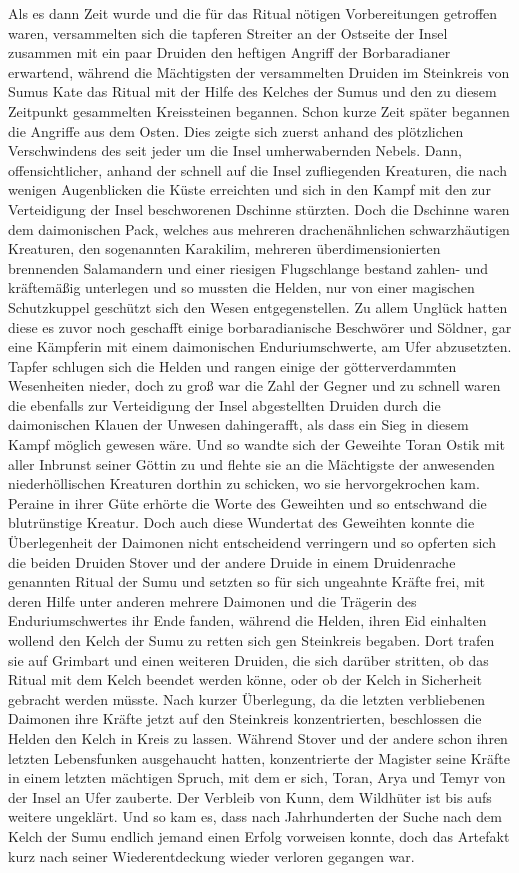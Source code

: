 Als es dann Zeit wurde und die für das Ritual nötigen Vorbereitungen getroffen waren, versammelten sich die tapferen Streiter an der Ostseite der Insel zusammen mit ein paar Druiden den heftigen Angriff der Borbaradianer erwartend, während die Mächtigsten der versammelten Druiden im Steinkreis von Sumus Kate das Ritual mit der Hilfe des Kelches der Sumus und den zu diesem Zeitpunkt gesammelten Kreissteinen begannen. Schon kurze Zeit später begannen die Angriffe aus dem Osten. Dies zeigte sich zuerst anhand des plötzlichen Verschwindens des seit jeder um die Insel umherwabernden Nebels. Dann, offensichtlicher, anhand der schnell auf die Insel zufliegenden Kreaturen, die nach wenigen Augenblicken die Küste erreichten und sich in den Kampf mit den zur Verteidigung der Insel beschworenen Dschinne stürzten. Doch die Dschinne waren dem daimonischen Pack, welches aus mehreren drachenähnlichen schwarzhäutigen Kreaturen, den sogenannten Karakilim, mehreren überdimensionierten brennenden Salamandern und einer riesigen Flugschlange bestand zahlen- und kräftemäßig unterlegen und so mussten die Helden, nur von einer magischen Schutzkuppel geschützt sich den Wesen entgegenstellen. Zu allem Unglück hatten diese es zuvor noch geschafft einige borbaradianische Beschwörer und Söldner, gar eine Kämpferin mit einem daimonischen Enduriumschwerte, am Ufer abzusetzten. Tapfer schlugen sich die Helden und rangen einige der götterverdammten Wesenheiten nieder, doch zu groß war die Zahl der Gegner und zu schnell waren die ebenfalls zur Verteidigung der Insel abgestellten Druiden durch die daimonischen Klauen der Unwesen dahingerafft, als dass ein Sieg in diesem Kampf möglich gewesen wäre. Und so wandte sich der Geweihte Toran Ostik mit aller Inbrunst seiner Göttin zu und flehte sie an die Mächtigste der anwesenden niederhöllischen Kreaturen dorthin zu schicken, wo sie hervorgekrochen kam. Peraine in ihrer Güte erhörte die Worte des Geweihten und so entschwand die blutrünstige Kreatur. Doch auch diese Wundertat des Geweihten konnte die Überlegenheit der Daimonen nicht entscheidend verringern und so opferten sich die beiden Druiden Stover und der andere Druide in einem Druidenrache genannten Ritual der Sumu und setzten so für sich ungeahnte Kräfte frei, mit deren Hilfe unter anderen mehrere Daimonen und die Trägerin des Enduriumschwertes ihr Ende fanden, während die Helden, ihren Eid einhalten wollend den Kelch der Sumu zu retten sich gen Steinkreis begaben. Dort trafen sie auf Grimbart und einen weiteren Druiden, die sich darüber stritten, ob das Ritual mit dem Kelch beendet werden könne, oder ob der Kelch in Sicherheit gebracht werden müsste. Nach kurzer Überlegung, da die letzten verbliebenen Daimonen ihre Kräfte jetzt auf den Steinkreis konzentrierten, beschlossen die Helden den Kelch in Kreis zu lassen. Während Stover und der andere schon ihren letzten Lebensfunken ausgehaucht hatten, konzentrierte der Magister seine Kräfte in einem letzten mächtigen Spruch, mit dem er sich, Toran, Arya und Temyr von der Insel an Ufer zauberte. Der Verbleib von Kunn, dem Wildhüter ist bis aufs weitere ungeklärt. Und so kam es, dass nach Jahrhunderten der Suche nach dem Kelch der Sumu endlich jemand einen Erfolg vorweisen konnte, doch das Artefakt kurz nach seiner Wiederentdeckung wieder verloren gegangen war.

